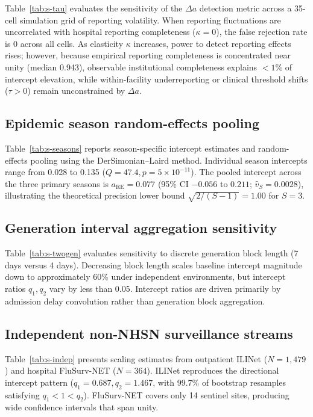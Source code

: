 \documentclass[preprint,12pt,authoryear]{elsarticle}
\begin{document}
Table~\ref{tab:s-tau} evaluates the sensitivity of the $\Delta a$ detection metric across a 35-cell simulation grid of reporting volatility. When reporting fluctuations are uncorrelated with hospital reporting completeness ($\kappa = 0$), the false rejection rate is 0 across all cells. As elasticity $\kappa$ increases, power to detect reporting effects rises; however, because empirical reporting completeness is concentrated near unity (median 0.943), observable institutional completeness explains $<1\%$ of intercept elevation, while within-facility underreporting or clinical threshold shifts ($\tau > 0$) remain unconstrained by $\Delta a$.

\subsection{Epidemic season random-effects pooling}
\label{sec:s-seasons}

Table~\ref{tab:s-seasons} reports season-specific intercept estimates and random-effects pooling using the DerSimonian--Laird method. Individual season intercepts range from 0.028 to 0.135 ($Q = 47.4, p = 5\times 10^{-11}$). The pooled intercept across the three primary seasons is $a_{\mathrm{RE}} = 0.077$ (95\% CI $-0.056$ to $0.211$; $\hat{v}_S = 0.0028$), illustrating the theoretical precision lower bound $\sqrt{2/(S-1)} = 1.00$ for $S = 3$.

\subsection{Generation interval aggregation sensitivity}
\label{sec:s-twogen}

Table~\ref{tab:s-twogen} evaluates sensitivity to discrete generation block length (7 days versus 4 days). Decreasing block length scales baseline intercept magnitude down to approximately 60\% under independent environments, but intercept ratios $q_1, q_2$ vary by less than 0.05. Intercept ratios are driven primarily by admission delay convolution rather than generation block aggregation.

\subsection{Independent non-NHSN surveillance streams}
\label{sec:s-indep}

Table~\ref{tab:s-indep} presents scaling estimates from outpatient ILINet ($N = 1{,}479$) and hospital FluSurv-NET ($N = 364$). ILINet reproduces the directional intercept pattern ($q_1 = 0.687, q_2 = 1.467$, with 99.7\% of bootstrap resamples satisfying $q_1 < 1 < q_2$). FluSurv-NET covers only 14 sentinel sites, producing wide confidence intervals that span unity.
\end{document}
